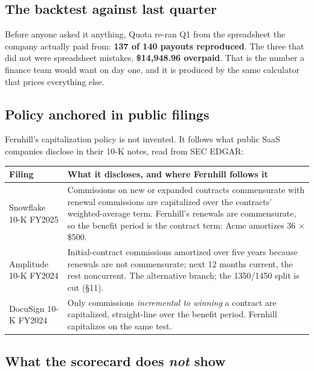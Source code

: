 \documentclass[10pt,a4paper]{article}
\newcommand{\gy}[1]{{\color{qgrey}#1}}
\begin{document}
\subsection{The backtest against last quarter}

Before anyone asked it anything, Quota re-ran Q1 from the spreadsheet the company actually paid from: \textbf{137 of 140 payouts reproduced}. The three that did not were spreadsheet mistakes, \textbf{\$14{,}948.96 overpaid}. That is the number a finance team would want on day one, and it is produced by the same calculator that prices everything else.

\subsection{Policy anchored in public filings}

Fernhill's capitalization policy is not invented. It follows what public SaaS companies disclose in their 10-K notes, read from SEC EDGAR:

\begin{tabularx}{\textwidth}{@{}p{34mm}X@{}}
\toprule
\textbf{Filing} & \textbf{What it discloses, and where Fernhill follows it}\\
\midrule
Snowflake 10-K \gy{FY2025} & Commissions on new or expanded contracts commensurate with renewal commissions are capitalized over the contracts' weighted-average term. \gy{Fernhill's renewals are commensurate, so the benefit period is the contract term: Acme amortizes 36 $\times$ \$500.}\\
Amplitude 10-K \gy{FY2024} & Initial-contract commissions amortized over five years because renewals are not commensurate; next 12 months current, the rest noncurrent. \gy{The alternative branch; the 1350/1450 split is cut (\S11).}\\
DocuSign 10-K \gy{FY2024} & Only commissions \emph{incremental to winning} a contract are capitalized, straight-line over the benefit period. \gy{Fernhill capitalizes on the same test.}\\
\bottomrule
\end{tabularx}

\subsection{What the scorecard does \emph{not} show}
\end{document}
